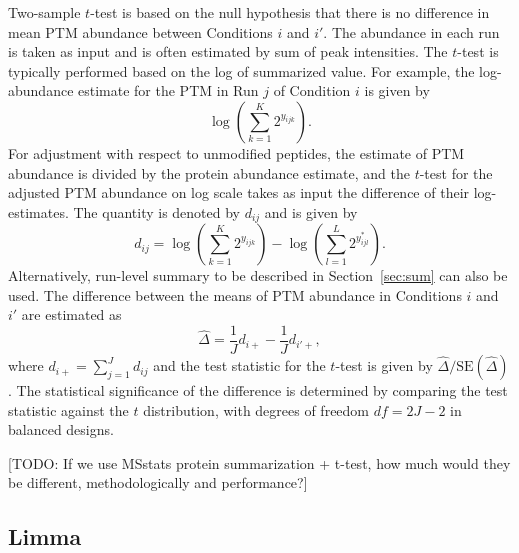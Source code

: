 \documentclass{mcp}
\def\todo#1{{\color{red}[TODO: #1]}}
\def\secref#1{Section~\ref{#1}}
\begin{document}
Two-sample $t$-test is based on the null hypothesis that there is no difference in mean PTM abundance between Conditions $i$ and $i'$. The abundance in each run is taken as input and is often estimated by sum of peak intensities. The $t$-test is typically performed based on the log of summarized value. For example, the log-abundance estimate for the PTM in Run $j$ of Condition $i$ is given by
\[
\log \left( \sum_{k=1}^{K} 2^{y_{ijk}} \right).
\]
For adjustment with respect to unmodified peptides, the estimate of PTM abundance is divided by the protein abundance estimate, 
and the $t$-test for the adjusted PTM abundance on log scale takes as input the difference of their log-estimates.
The quantity is denoted by $d_{ij}$ and is given by
\[
d_{ij} = \log \left( \sum_{k=1}^{K} 2^{y_{ijk}} \right) - \log \left( \sum_{l=1}^{L} 2^{y_{ijl}^{\ast}} \right).
\]
Alternatively, run-level summary to be described in \secref{sec:sum} can also be used. The difference between the means of PTM abundance in Conditions $i$ and $i'$ are estimated as
\[
\hat{\Delta} = \frac{1}{J} d_{i+} - \frac{1}{J} d_{i'+},
\]
where $d_{i+} = \sum_{j=1}^{J} d_{ij}$ and the test statistic for the $t$-test is given by $\hat{\Delta} / \mathrm{SE}(\hat{\Delta})$. The statistical significance of the difference is determined by comparing the test statistic against the $t$ distribution, with degrees of freedom $df=2J-2$ in balanced designs.

\todo{If we use MSstats protein summarization + t-test, how much would they be different, methodologically and performance?}


\subsection{Limma}
\end{document}
